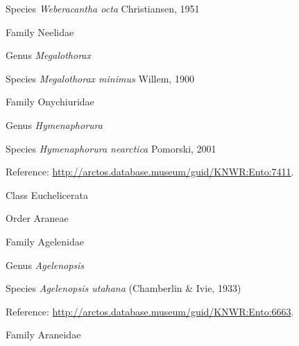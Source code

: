 \documentclass[9pt, article]{memoir}
\begin{document}
\begin{multicols}{2}
\vspace{6pt}\noindent\hspace{36pt}Species \textit{Weberacantha octa} Christiansen, 1951


\vspace{6pt}\noindent\hspace{24pt}Family Neelidae


\vspace{6pt}\noindent\hspace{30pt}Genus \textit{Megalothorax}


\vspace{6pt}\noindent\hspace{36pt}Species \textit{Megalothorax minimus} Willem, 1900


\vspace{6pt}\noindent\hspace{24pt}Family Onychiuridae


\vspace{6pt}\noindent\hspace{30pt}Genus \textit{Hymenaphorura}


\vspace{6pt}\noindent\hspace{36pt}Species \textit{Hymenaphorura nearctica} Pomorski, 2001


\vspace{6pt}Reference: 
\url{http://arctos.database.museum/guid/KNWR:Ento:7411}.

\vspace{6pt}\noindent\hspace{12pt}Class Euchelicerata


\vspace{6pt}\noindent\hspace{18pt}Order Araneae


\vspace{6pt}\noindent\hspace{24pt}Family Agelenidae


\vspace{6pt}\noindent\hspace{30pt}Genus \textit{Agelenopsis}


\vspace{6pt}\noindent\hspace{36pt}Species \textit{Agelenopsis utahana} (Chamberlin \& Ivie, 1933)


\vspace{6pt}Reference: 
\url{http://arctos.database.museum/guid/KNWR:Ento:6663}.

\vspace{6pt}\noindent\hspace{24pt}Family Araneidae



\end{multicols}
\end{document}
